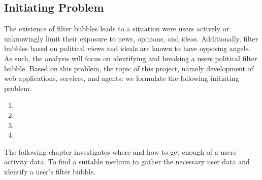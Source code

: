 \subsection*{Initiating Problem} 
The existence of filter bubbles leads to a situation were users actively or
unknowingly limit their exposure to news, opinions, and ideas. Additionally,
filter bubbles based on political views and ideals are known to have opposing
angels. As such, the analysis will focus on identifying and breaking a users
political filter bubble. Based on this problem, the topic of this project,
namely development of web applications, services, and agents: we formulate the
following initiating problem.


\begin{center}
\begin{minipage}{0.95\linewidth}

\begin{enumerate}
  \item {}
  
  \item {}
  
  \item {}
  
  \item {}
  
\end{enumerate}

\end{minipage}
\end{center}

\nl \nl \nl 
The following chapter investigates where and how to get enough of a users
activity data. To find a suitable medium to gather the necessary user data and
identify a user's filter bubble.
